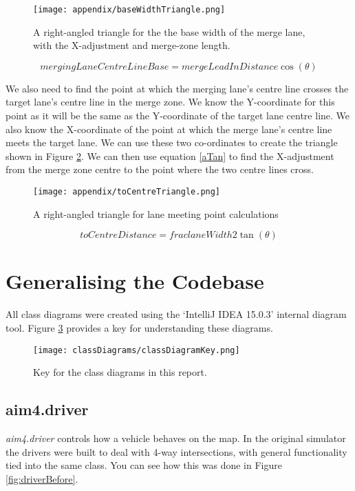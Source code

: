 \begin{appendices}
\begin{figure}[htb]
\centering
\texttt{[image: appendix/baseWidthTriangle.png]}
\caption{A right-angled triangle for the the base width of the merge lane, with the X-adjustment and merge-zone length.}
\label{fig:baseWidthTriangle}
\end{figure}

\begin{equation}\label{aCos}
mergingLaneCentreLineBase = mergeLeadInDistance \cos(\theta)
\end{equation}

We also need to find the point at which the merging lane's centre line crosses the target lane's centre line in the merge zone. We know the Y-coordinate for this point as it will be the same as the Y-coordinate of the target lane centre line. We also know the X-coordinate of the point at which the merge lane's centre line meets the target lane. We can use these two co-ordinates to create the triangle shown in Figure \ref{fig:toCentreTriangle}. We can then use equation \ref{aTan} to find the X-adjustment from the merge zone centre to the point where the two centre lines cross.

\begin{figure}[htb]
\centering
\texttt{[image: appendix/toCentreTriangle.png]}
\caption{A right-angled triangle for lane meeting point calculations}
\label{fig:toCentreTriangle}
\end{figure}

\begin{equation}\label{aTan}
toCentreDistance = frac{laneWidth}{2 \tan(\theta)}
\end{equation}

\section{Generalising the Codebase}
\label{sec:Generalising the Codebase Appendix}
All class diagrams were created using the `IntelliJ IDEA 15.0.3' internal diagram tool. Figure \ref{fig:classDiagramKey} provides a key for understanding these diagrams.

\begin{figure}[htb]
\texttt{[image: classDiagrams/classDiagramKey.png]}
\caption{Key for the class diagrams in this report.}
\label{fig:classDiagramKey}
\end{figure}

\subsection{aim4.driver}
\label{subsec:aim4.driver}
\emph{aim4.driver} controls how a vehicle behaves on the map. In the original simulator the drivers were built to deal with 4-way intersections, with general functionality tied into the same class. You can see how this was done in Figure \ref{fig:driverBefore}.


\end{appendices}
